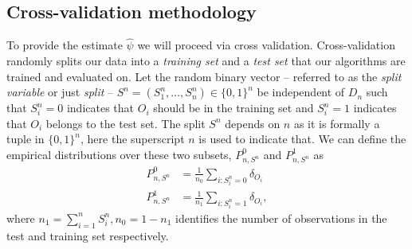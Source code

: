 \documentclass[11pt, a4paper]{article}
\theoremstyle{definition}
\theoremstyle{remark}
\newcommand{\la}{\psi}
\newcommand{\Sn}{S^n}
\begin{document}
\subsection{Cross-validation methodology}
To provide the estimate $ \hat{\la} $ we will proceed via cross validation. Cross-validation randomly splits our data into a \textit{training set} and a \textit{test set} that our algorithms are trained and evaluated on. Let the random binary vector -- referred to as the \textit{split variable} or just \textit{split} -- $ \Sn = (\Sn_1,\ldots,\Sn_n) \in \{0,1\}^{n} $ be independent of $ D_n $ such that $ \Sn_i = 0 $ indicates that $ O_i $ should be in the training set and $ \Sn_i = 1 $ indicates that $ O_i $ belongs to the test set. The split $ \Sn $ depends on $ n $ as it is formally a tuple in $ \{0,1\}^{n} $, here the superscript $ n $ is used to indicate that. We can define the empirical distributions over these two subsets, $ P_{n,\Sn}^0$ and $ P_{n,\Sn}^{1} $ as
\begin{align*}
    P_{n,\Sn}^{0} &= \frac{1}{n_0} \sum_{i: \Sn_i = 0} \delta_{O_i} \\
    P_{n,\Sn}^{1} &= \frac{1}{n_1} \sum_{i: \Sn_i = 1} \delta_{O_i},
\end{align*}
where $ n_1 = \sum_{i = 1}^{n} \Sn_i, n_0 = 1-n_1$ identifies the number of observations in the test and training set respectively.
\end{document}
